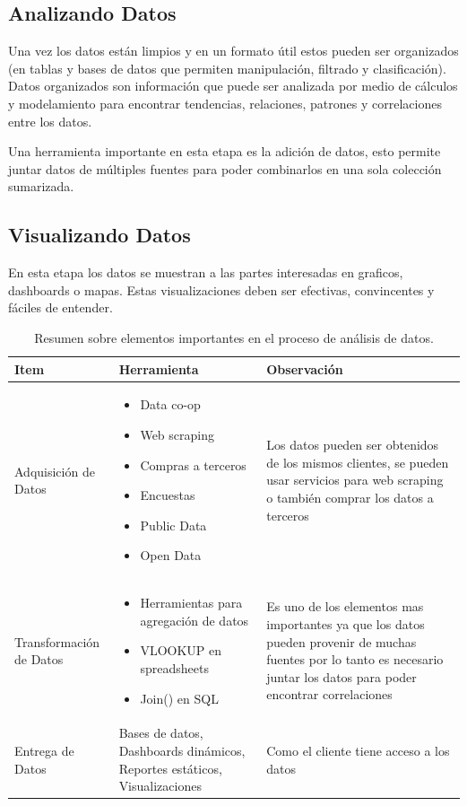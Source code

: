 \documentclass[12pt,a4paper,openright]{article}
\begin{document}
\subsection{Analizando Datos}
Una vez los datos están limpios y en un formato útil estos pueden ser organizados (en tablas y bases de datos que permiten manipulación, filtrado y clasificación). Datos organizados son información que puede ser analizada por medio de cálculos y modelamiento para encontrar tendencias, relaciones, patrones y correlaciones entre los datos.

Una herramienta importante en esta etapa es la adición de datos, esto permite juntar datos de múltiples fuentes para poder combinarlos en una sola colección sumarizada.

\subsection{Visualizando Datos}
En esta etapa los datos se muestran a las partes interesadas en graficos, dashboards o mapas. Estas visualizaciones deben ser efectivas, convincentes y fáciles de entender.



\begin{table}[ht]
\centering
\begin{tabular}{|p{5cm}|p{5cm}|p{5cm}|}
\hline
\textbf{Item} & \textbf{Herramienta} & \textbf{Observaci\'on} \\ 
\hline
\hline 
\vspace{2.85 cm}Adquisici\'on de Datos & \begin{itemize}
    \item Data co-op
    \item Web scraping
    \item Compras a terceros
    \item Encuestas
    \item Public Data
    \item Open Data
\end{itemize}	 &  Los datos pueden ser obtenidos de los mismos clientes, se pueden usar servicios para web scraping o tambi\'en comprar los datos a terceros\\ \hline 
\vspace{2.05 cm}Transformaci\'on de Datos & \begin{itemize}
    \item  Herramientas para agregación de datos
    \item VLOOKUP en spreadsheets
    \item Join() en SQL
\end{itemize} & Es uno de los elementos mas importantes ya que los datos pueden provenir de muchas fuentes por lo tanto es necesario juntar los datos para poder encontrar correlaciones \\ \hline
Entrega de Datos & 	
     Bases de datos,
     Dashboards dinámicos,
     Reportes estáticos,
     Visualizaciones
 & Como el cliente tiene acceso a los datos \\ \hline
\end{tabular}
\caption{Resumen sobre elementos importantes en el proceso de análisis de datos.}
\end{table}
\end{document}
